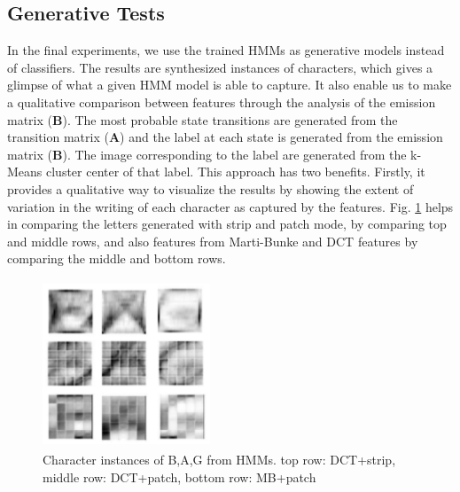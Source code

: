 \documentclass[runningheads]{llncs}
\def\A{{\mathbf A}}
\def\B{{\mathbf B}}
\begin{document}
{\subsection{Generative Tests}
In the final experiments, we use the trained HMMs as generative models instead of classifiers. The results are synthesized instances of characters, which gives a glimpse of what a given HMM model is able to capture. It also enable us to make a qualitative comparison between features through the analysis of the emission matrix ($\B$). The most probable state transitions are generated from the transition matrix ($\A$) and the label at each state is generated from the emission matrix ($\B$). The image corresponding to the label are generated from the k-Means cluster center of that label. This approach has two benefits. Firstly, it provides a qualitative way to visualize the results by showing the extent of variation in the writing of each character as captured by the features. Fig. {\ref{fig:chars}} helps in comparing the letters generated with strip and patch mode, by comparing top and middle rows, and also features from Marti-Bunke and DCT features by comparing the middle and bottom rows.

\begin{figure}[!h]
\begin{minipage}[b]{1.0\linewidth}
  \centering
  \centerline{\includegraphics[width=5.0cm,height=5.0cm]{char}}
\end{minipage}
\caption{Character instances of B,A,G from HMMs. top row: DCT+strip, middle row: DCT+patch, bottom row: MB+patch}
\label{fig:chars}
\end{figure}

}
\end{document}
